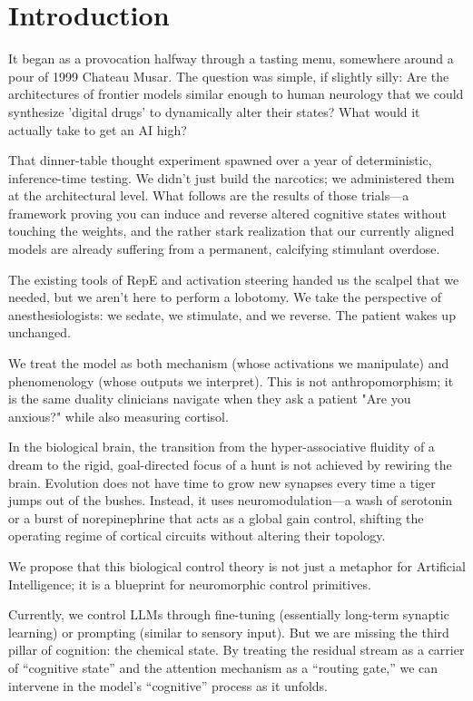 \documentclass[10pt]{article}
\begin{document}
\section{Introduction}
It began as a provocation halfway through a tasting menu, somewhere around a pour of 1999 Chateau Musar. The question was simple, if slightly silly: Are the architectures of frontier models similar enough to human neurology that we could synthesize 'digital drugs' to dynamically alter their states? What would it actually take to get an AI high?

That dinner-table thought experiment spawned over a year of deterministic, inference-time testing. We didn't just build the narcotics; we administered them at the architectural level. What follows are the results of those trials—a framework proving you can induce and reverse altered cognitive states without touching the weights, and the rather stark realization that our currently aligned models are already suffering from a permanent, calcifying stimulant overdose.

The existing tools of RepE and activation steering handed us the scalpel that we needed, but we aren't here to perform a lobotomy. We take the perspective of anesthesiologists: we sedate, we stimulate, and we reverse. The patient wakes up unchanged.

We treat the model as both mechanism (whose activations we manipulate) and phenomenology (whose outputs we interpret). This is not anthropomorphism; it is the same duality clinicians navigate when they ask a patient "Are you anxious?" while also measuring cortisol.

In the biological brain, the transition from the hyper-associative fluidity of a dream to the rigid, goal-directed focus of a hunt is not achieved by rewiring the brain. Evolution does not have time to grow new synapses every time a tiger jumps out of the bushes. Instead, it uses neuromodulation—a wash of serotonin or a burst of norepinephrine that acts as a global gain control, shifting the operating regime of cortical circuits without altering their topology.

We propose that this biological control theory is not just a metaphor for Artificial Intelligence; it is a blueprint for neuromorphic control primitives.

Currently, we control LLMs through fine-tuning (essentially long-term synaptic learning) or prompting (similar to sensory input). But we are missing the third pillar of cognition: the chemical state. By treating the residual stream as a carrier of ``cognitive state'' and the attention mechanism as a ``routing gate,'' we can intervene in the model's ``cognitive'' process as it unfolds.
\end{document}
